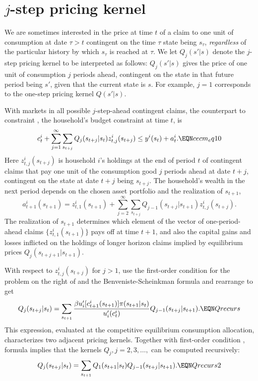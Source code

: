 \section{$j$-step pricing kernel}\label{sec:multi-step}%
We are sometimes interested in the price at time $t$ of a claim to
one unit of consumption at date $\tau >t $ contingent on the
time $\tau$ state being $s_\tau$, {\it regardless\/} of the
particular history by which $s_\tau$ is reached at $\tau$.  We let
$Q_j(s' | s)$ denote the $j$-step pricing kernel to be interpreted
as follows: $Q_j(s' | s)$ gives the price of one unit of
consumption $j$ periods ahead, contingent on the state in that
future period being $s'$, given that the current state is $s$. For
example, $j=1$ corresponds to the one-step pricing kernel $Q(s' |
s)$.


With markets in all possible $j$-step-ahead contingent claims,
the counterpart to constraint , the household's budget
constraint at time $t$, is
$$ c_t^i + \sum_{j=1}^\infty \sum_{ s_{t+j}} Q_j( s_{t+j} | s_t)
   z^i_{t,j}( s_{t+j}) \leq  y^i(s_t) + a_t^i. \EQN cecm_eq10   $$
Here $z^i_{t,j}( s_{t+j})$ is household $i$'s holdings at
the end of period $t$ of contingent claims that pay one unit of
the consumption good $j$ periods ahead at date $t+j$, contingent on
the state at date $t+j$ being $ s_{t+j}$. The household's
wealth in the next period  depends on the chosen asset portfolio
and the realization of $s_{t+1}$,
$$
a^i_{t+1}(s_{t+1}) = z^i_{t,1}(s_{t+1})
   + \sum_{j=2}^\infty \sum_{ s_{t+j}}  Q_{j-1}( s_{t+j} | s_{t+1})
           z^i_{t,j}( s_{t+j}) .
$$
The realization of $s_{t+1}$ determines which element of the vector of
one-period-ahead claims $\{z^i_{t,1}( s_{t+1})\}$  pays off at
time $t+1$,
and also the capital gains and losses inflicted on the holdings of longer horizon
claims implied by equilibrium prices $Q_j( s_{t+j+1} | s_{t+1})$.


With respect to $z^i_{t,j}( s_{t+j})$ for $j>1$,
use the first-order condition for the problem on the right of 
and the Benveniste-Scheinkman formula and rearrange to get
$$ Q_j( s_{t+j} | s_t ) = \sum_{s_{t+1}}
   {\beta u'_i[c^i_{t+1}(s_{t+1})] \pi(s_{t+1} | s_t) \over u'_i(c_t^i) }
   Q_{j-1}( s_{t+j} | s_{t+1} ).             \EQN Qrecurs $$
This expression, evaluated at the competitive equilibrium
consumption allocation, characterizes two adjacent pricing
kernels. Together with first-order
condition , formula   implies that the
kernels $Q_j, j = 2, 3, \ldots,$ can be computed recursively:
$$ Q_j( s_{t+j} | s_t) = \sum_{s_{t+1}} Q_1(s_{t+1} | s_t)
                      Q_{j-1}( s_{t+j} | s_{t+1}). \EQN Qrecurs2 $$




